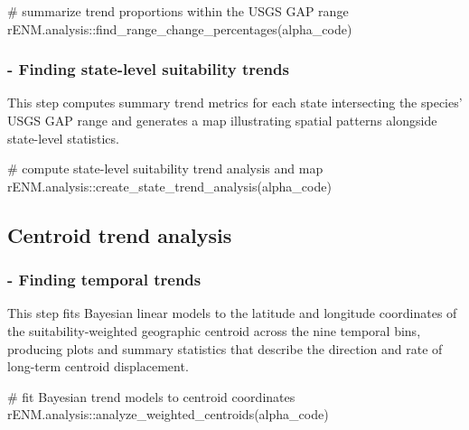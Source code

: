 \documentclass[
  letterpaper,
  DIV=11,
  numbers=noendperiod]{scrartcl}
\newenvironment{Shaded}{\begin{snugshade}}{\end{snugshade}}
\newcommand{\CommentTok}[1]{\textcolor[rgb]{0.37,0.37,0.37}{#1}}
\newcommand{\FunctionTok}[1]{\textcolor[rgb]{0.28,0.35,0.67}{#1}}
\newcommand{\NormalTok}[1]{\textcolor[rgb]{0.00,0.23,0.31}{#1}}
\newcommand{\SpecialCharTok}[1]{\textcolor[rgb]{0.37,0.37,0.37}{#1}}
\begin{document}
\begin{Shaded}
\begin{Highlighting}[]
\CommentTok{\# summarize trend proportions within the USGS GAP range}
\NormalTok{rENM.analysis}\SpecialCharTok{::}\FunctionTok{find\_range\_change\_percentages}\NormalTok{(alpha\_code)}
\end{Highlighting}
\end{Shaded}

\subsubsection{- Finding state-level suitability
trends}\label{finding-state-level-suitability-trends}

This step computes summary trend metrics for each state intersecting the
species' USGS GAP range and generates a map illustrating spatial
patterns alongside state-level statistics.

\begin{Shaded}
\begin{Highlighting}[]
\CommentTok{\# compute state{-}level suitability trend analysis and map}
\NormalTok{rENM.analysis}\SpecialCharTok{::}\FunctionTok{create\_state\_trend\_analysis}\NormalTok{(alpha\_code)}
\end{Highlighting}
\end{Shaded}

\subsection{Centroid trend analysis}\label{centroid-trend-analysis}

\subsubsection{- Finding temporal trends}\label{finding-temporal-trends}

This step fits Bayesian linear models to the latitude and longitude
coordinates of the suitability-weighted geographic centroid across the
nine temporal bins, producing plots and summary statistics that describe
the direction and rate of long-term centroid displacement.

\begin{Shaded}
\begin{Highlighting}[]
\CommentTok{\# fit Bayesian trend models to centroid coordinates}
\NormalTok{rENM.analysis}\SpecialCharTok{::}\FunctionTok{analyze\_weighted\_centroids}\NormalTok{(alpha\_code)}
\end{Highlighting}
\end{Shaded}
\end{document}
